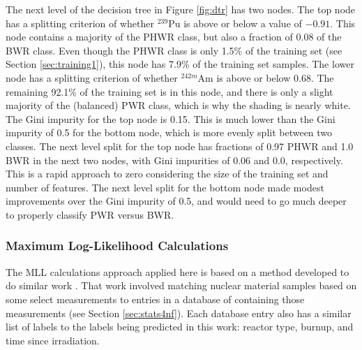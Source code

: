 The next level of the decision tree in Figure \ref{fig:dtr} has two nodes. The
top node has a splitting criterion of whether ${}^{239}\text{Pu}$ is above or
below a value of $-0.91$.  This node contains a majority of the \gls{PHWR}
class, but also a fraction of 0.08 of the \gls{BWR} class.  Even though the
\gls{PHWR} class is only 1.5\% of the training set (see Section
\ref{sec:training1}), this node has 7.9\% of the training set samples.  The
lower node has a splitting criterion of whether ${}^{242m}\text{Am}$ is above
or below 0.68.  The remaining 92.1\% of the training set is in this node, and
there is only a slight majority of the (balanced) \gls{PWR} class, which is why
the shading is nearly white. The Gini impurity for the top node is 0.15. This
is much lower than the Gini impurity of 0.5 for the bottom node, which is more
evenly split between two classes. The next level split for the top node has
fractions of 0.97 \gls{PHWR} and 1.0 \gls{BWR} in the next two nodes, with Gini
impurities of 0.06 and 0.0, respectively. This is a rapid approach to zero
considering the size of the training set and number of features. The next level
split for the bottom node made modest improvements over the Gini impurity of
0.5, and would need to go much deeper to properly classify \gls{PWR} versus
\gls{BWR}.

\subsubsection{Maximum Log-Likelihood Calculations}

The \gls{MLL} calculations approach applied here is based on a method developed
to do similar work \cite{mll_method, mll_validate, mll_sensitivity}.  That work
involved matching nuclear material samples based on some select measurements to
entries in a database of containing those measurements (see Section
\ref{sec:stats4nf}).  Each database entry also has a similar list of labels to
the labels being predicted in this work: reactor type, burnup, and time since
irradiation.

